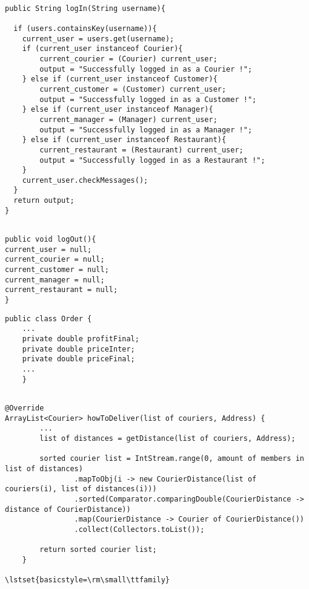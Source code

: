 \begin{lstlisting}[caption=the main methods for the log in log out system.,
  label=lst:login]

public String logIn(String username){

  if (users.containsKey(username)){
    current_user = users.get(username);
    if (current_user instanceof Courier){
    	current_courier = (Courier) current_user;
    	output = "Successfully logged in as a Courier !";
    } else if (current_user instanceof Customer){
    	current_customer = (Customer) current_user;
    	output = "Successfully logged in as a Customer !";
    } else if (current_user instanceof Manager){
    	current_manager = (Manager) current_user;
    	output = "Successfully logged in as a Manager !";
    } else if (current_user instanceof Restaurant){
    	current_restaurant = (Restaurant) current_user;
    	output = "Successfully logged in as a Restaurant !";
    }
    current_user.checkMessages(); 
  }
  return output;
}
\end{lstlisting}

\begin{lstlisting}[caption=the main methods for the log in log out system.,
  label=lst:logout]

public void logOut(){
current_user = null;
current_courier = null;
current_customer = null;
current_manager = null;
current_restaurant = null;
}
\end{lstlisting}



\begin{lstlisting}[caption=Implementation of different price quantities in \texttt{Order}.,
  label=lst:prices_order]
public class Order {
	...
	private double profitFinal;
	private double priceInter;
	private double priceFinal;
	...
	}
\end{lstlisting}

 \begin{lstlisting}[caption=Fastest Delivery Method.,
   label=lst:fast_deliv_meth] 

@Override
ArrayList<Courier> howToDeliver(list of couriers, Address) {
		...
		list of distances = getDistance(list of couriers, Address);
	
		sorted courier list = IntStream.range(0, amount of members in list of distances)
				.mapToObj(i -> new CourierDistance(list of couriers(i), list of distances(i)))
			    .sorted(Comparator.comparingDouble(CourierDistance -> distance of CourierDistance))
			    .map(CourierDistance -> Courier of CourierDistance())
			    .collect(Collectors.toList());
				
		return sorted courier list;
	}
  
\lstset{basicstyle=\rm\small\ttfamily}
\end{lstlisting}

